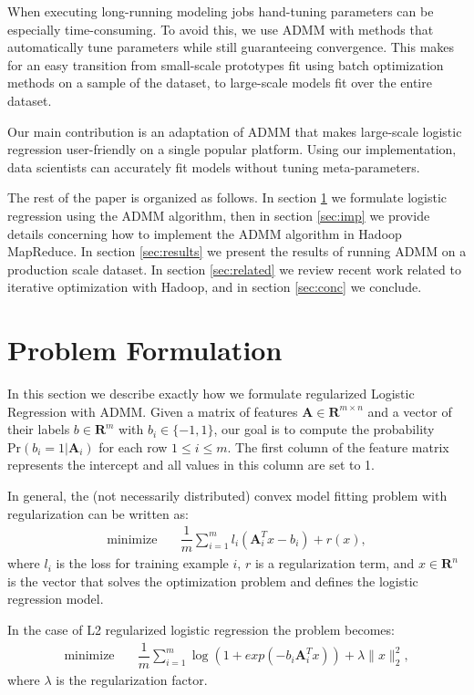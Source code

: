 \documentclass[10pt, conference, compsocconf]{IEEEtran}
\begin{document}
When executing long-running modeling jobs hand-tuning parameters can be especially time-consuming.  To avoid this, we use ADMM with methods that automatically tune parameters while still guaranteeing convergence.  This makes for an easy transition from small-scale prototypes fit using batch optimization methods on a sample of the dataset, to large-scale models fit over the entire dataset.

Our main contribution is an adaptation of ADMM that makes large-scale logistic regression user-friendly on a single popular platform.  Using our implementation, data scientists can accurately fit models without tuning meta-parameters.

The rest of the paper is organized as follows.  In section \ref{sec:prob} we formulate logistic regression using the ADMM algorithm, then in section \ref{sec:imp} we provide details concerning how to implement the ADMM algorithm in Hadoop MapReduce.  In section \ref{sec:results} we present the results of running ADMM on a production scale dataset.  In section \ref{sec:related} we review recent work related to iterative optimization with Hadoop, and in section \ref{sec:conc} we conclude.

\section{Problem Formulation}\label{sec:prob}

In this section we describe exactly how we formulate regularized Logistic Regression with ADMM. Given a matrix of features $\mathbf{A}\in\mathbf{R}^{m\times n}$ and a vector of their labels $b\in\mathbf{R}^m$ with $b_i\in\{-1,1\}$, our goal is to compute the probability $\text{Pr}(b_i=1|\mathbf{A}_i)$ for each row $1\leq i\leq m$.  The first column of the feature matrix represents the intercept and all values in this column are set to 1.

In general, the (not necessarily distributed) convex model fitting problem with regularization can be written as:
\begin{align*}
\text{minimize}&\quad \dfrac{1}{m}\sum_{i=1}^m l_i(\mathbf{A}_i^Tx - b_i) + r(x),
\end{align*}
where $l_i$ is the loss for training example $i$, $r$ is a regularization term, and $x\in\mathbf{R}^n$ is the vector that solves the optimization problem and defines the logistic regression model.

In the case of L2 regularized logistic regression the problem becomes:
\begin{align*}
\text{minimize}&\quad \dfrac{1}{m}\sum_{i=1}^m \log(1 + exp(-b_i\mathbf{A}_i^Tx)) + \lambda\|x\|_2^2,
\end{align*}
where $\lambda$ is the regularization factor.
\end{document}
